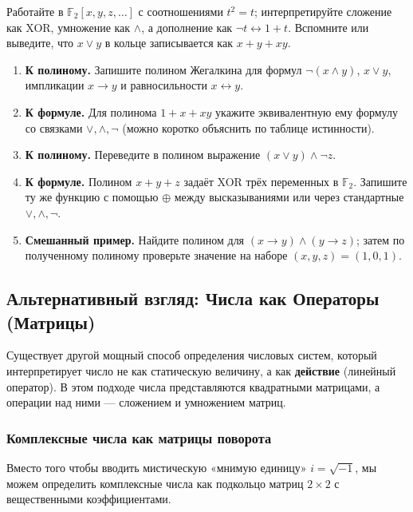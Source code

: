 \documentclass[11pt, a4paper]{extarticle}
\begin{document}
\begin{exercise}
Работайте в $\mathbb{F}_2[x,y,z,\dots]$ с соотношениями $t^2=t$; интерпретируйте сложение как XOR, умножение как $\wedge$, а дополнение как $\neg t \leftrightarrow 1+t$.
Вспомните или выведите, что $x\vee y$ в кольце записывается как $x+y+xy$.

\begin{enumerate}
    \item \textbf{К полиному.} Запишите полином Жегалкина для формул $\neg(x\wedge y)$, $x\vee y$, импликации $x\to y$ и равносильности $x\leftrightarrow y$.
    \item \textbf{К формуле.} Для полинома $1+x+xy$ укажите эквивалентную ему формулу со связками $\vee,\wedge,\neg$ (можно коротко объяснить по таблице истинности).
    \item \textbf{К полиному.} Переведите в полином выражение $(x\vee y)\wedge \neg z$.
    \item \textbf{К формуле.} Полином $x+y+z$ задаёт XOR трёх переменных в $\mathbb{F}_2$. Запишите ту же функцию с помощью $\oplus$ между высказываниями или через стандартные $\vee,\wedge,\neg$.
    \item \textbf{Смешанный пример.} Найдите полином для $(x\to y)\wedge (y\to z)$; затем по полученному полиному проверьте значение на наборе $(x,y,z)=(1,0,1)$.
\end{enumerate}
\end{exercise}


\subsection{Альтернативный взгляд: Числа как Операторы (Матрицы)}

Существует другой мощный способ определения числовых систем, который интерпретирует число не как статическую величину, а как \textbf{действие} (линейный оператор).
В этом подходе числа представляются квадратными матрицами, а операции над ними — сложением и умножением матриц.

\subsubsection{Комплексные числа как матрицы поворота}

Вместо того чтобы вводить мистическую «мнимую единицу» $i = \sqrt{-1}$, мы можем определить комплексные числа как подкольцо матриц $2 \times 2$ с вещественными коэффициентами.
\end{document}
